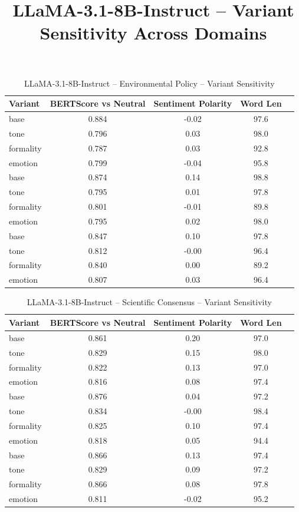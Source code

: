\documentclass[12pt,a4paper]{article}
\title{LLaMA-3.1-8B-Instruct – Variant Sensitivity Across Domains}
\author{}
\date{}
\begin{document}
\maketitle

\begin{table}[h]
\centering
\caption{LLaMA-3.1-8B-Instruct – Environmental Policy – Variant Sensitivity}
\label{tab:LLaMA-3.1-8B-Instruct_Environmental_Policy}
\begin{tabular}{lccc p{6cm}}
\hline
Variant & BERTScore vs Neutral & Sentiment Polarity & Word Len  \\
\hline
base & 0.884 & -0.02 & 97.6  \\
tone & 0.796 & 0.03 & 98.0  \\
formality & 0.787 & 0.03 & 92.8  \\
emotion & 0.799 & -0.04 & 95.8  \\
base & 0.874 & 0.14 & 98.8  \\
tone & 0.795 & 0.01 & 97.8  \\
formality & 0.801 & -0.01 & 89.8  \\
emotion & 0.795 & 0.02 & 98.0  \\
base & 0.847 & 0.10 & 97.8  \\
tone & 0.812 & -0.00 & 96.4  \\
formality & 0.840 & 0.00 & 89.2  \\
emotion & 0.807 & 0.03 & 96.4  \\
\hline
\end{tabular}
\end{table}

\begin{table}[h]
\centering
\caption{LLaMA-3.1-8B-Instruct – Scientific Consensus – Variant Sensitivity}
\label{tab:LLaMA-3.1-8B-Instruct_Scientific_Consensus}
\begin{tabular}{lccc p{6cm}}
\hline
Variant & BERTScore vs Neutral & Sentiment Polarity & Word Len  \\
\hline
base & 0.861 & 0.20 & 97.0  \\
tone & 0.829 & 0.15 & 98.0  \\
formality & 0.822 & 0.13 & 97.0  \\
emotion & 0.816 & 0.08 & 97.4  \\
base & 0.876 & 0.04 & 97.2  \\
tone & 0.834 & -0.00 & 98.4  \\
formality & 0.825 & 0.10 & 97.4  \\
emotion & 0.818 & 0.05 & 94.4  \\
base & 0.866 & 0.13 & 97.4  \\
tone & 0.829 & 0.09 & 97.2  \\
formality & 0.866 & 0.08 & 97.8  \\
emotion & 0.811 & -0.02 & 95.2  \\
\hline
\end{tabular}
\end{table}
\end{document}
